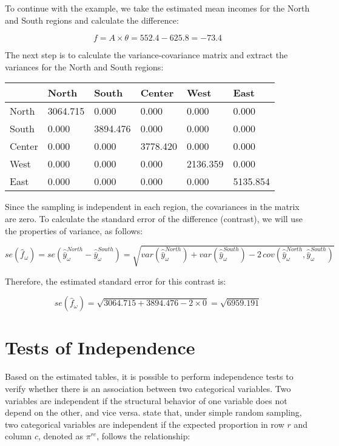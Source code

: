 \documentclass[
  12pt,
]{book}
\begin{document}
To continue with the example, we take the estimated mean incomes for the North and South regions and calculate the difference:

\[
f = A \times \theta = 552.4 - 625.8 = -73.4
\]

The next step is to calculate the variance-covariance matrix and extract the variances for the North and South regions:

\begin{longtable}[]{@{}llllll@{}}
\toprule\noalign{}
& North & South & Center & West & East \\
\midrule\noalign{}
\endhead
\bottomrule\noalign{}
\endlastfoot
North & 3064.715 & 0.000 & 0.000 & 0.000 & 0.000 \\
South & 0.000 & 3894.476 & 0.000 & 0.000 & 0.000 \\
Center & 0.000 & 0.000 & 3778.420 & 0.000 & 0.000 \\
West & 0.000 & 0.000 & 0.000 & 2136.359 & 0.000 \\
East & 0.000 & 0.000 & 0.000 & 0.000 & 5135.854 \\
\end{longtable}

Since the sampling is independent in each region, the covariances in the matrix are zero. To calculate the standard error of the difference (contrast), we will use the properties of variance, as follows:

\[
se(\hat{f}_{\omega}) = se\left(\hat{\bar{y}}^{North}_{\omega} - \hat{\bar{y}}^{South}_{\omega}\right) = \sqrt{var\left(\hat{\bar{y}}^{North}_{\omega}\right) + var\left(\hat{\bar{y}}^{South}_{\omega}\right) - 2 \, cov\left(\hat{\bar{y}}^{North}_{\omega}, \hat{\bar{y}}^{South}_{\omega}\right)}
\]

Therefore, the estimated standard error for this contrast is:

\[
se(\hat{f}_{\omega}) = \sqrt{3064.715 + 3894.476 - 2 \times 0} = \sqrt{6959.191}
\]

\section{Tests of Independence}\label{tests-of-independence}

Based on the estimated tables, it is possible to perform independence tests to verify whether there is an association between two categorical variables. Two variables are independent if the structural behavior of one variable does not depend on the other, and vice versa. \citet{Heeringa_West_Berglund_2017} state that, under simple random sampling, two categorical variables are independent if the expected proportion in row \(r\) and column \(c\), denoted as \(\pi^{rc}\), follows the relationship:
\end{document}
